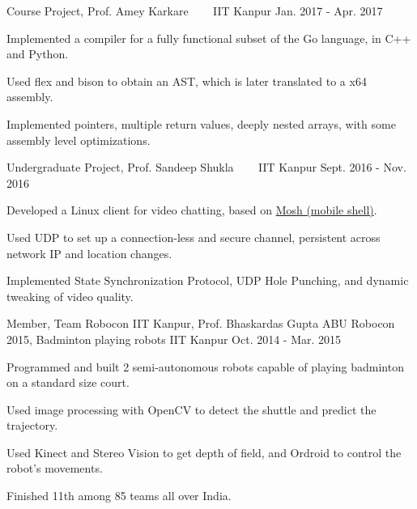 \begin{cventries}
  \cventry
  {Course Project, Prof. Amey Karkare}
  {\href{https://github.com/pallavagarwal07/amigo.git}{}
    \ \ \ \normalfont\href{https://github.com/pallavagarwal07/amigo}
    {}}
  {IIT Kanpur}
  {Jan. 2017 - Apr. 2017}
  {
    \begin{cvitems}
    \item Implemented a compiler for a fully functional subset of the Go language, in C++ and Python.
    \item Used flex and bison to obtain an AST, which is later translated to a x64 assembly.
    \item Implemented pointers, multiple return values, deeply nested arrays, with some assembly level optimizations.
    \end{cvitems}
  }

  \cventry
  {Undergraduate Project, Prof. Sandeep Shukla}
  {\href{https://github.com/netsecIITK/moVi}{}
    \ \ \ \normalfont\href{https://github.com/netsecIITK/moVi}
    {}}
  {IIT Kanpur}
  {Sept. 2016 - Nov. 2016}
  {
    \begin{cvitems}
    \item Developed a Linux client for video chatting,
      based on \href{https://mosh.org/}{Mosh (mobile shell)}.
    \item Used UDP to set up a connection-less and secure channel,
      persistent across network IP and location changes.
    \item Implemented State Synchronization Protocol, UDP Hole
      Punching, and dynamic tweaking of video quality.
    \end{cvitems}
  }

  \cventry
  {Member, Team Robocon IIT Kanpur, Prof. Bhaskardas Gupta}
  {ABU Robocon 2015, Badminton playing robots}
  {IIT Kanpur}
  {Oct. 2014 - Mar. 2015}
  {
    \begin{cvitems}
    \item Programmed and built 2 semi-autonomous robots
      capable of playing badminton on a standard size court.
    \item Used image processing with OpenCV to detect the shuttle
      and predict the trajectory.
    \item Used Kinect and Stereo Vision to get depth of
      field, and Ordroid to control the robot's movements.
    \item Finished 11th among 85 teams all over India.
    \end{cvitems}
  }

\end{cventries}

